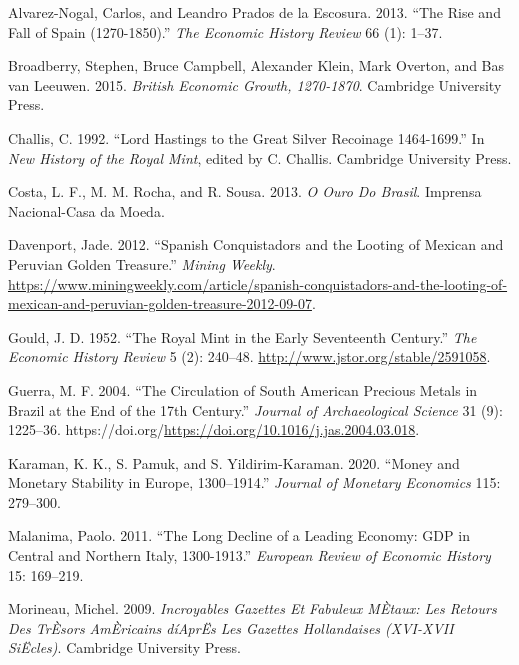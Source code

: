 \documentclass[
  letterpaper,
  DIV=11,
  numbers=noendperiod]{scrartcl}
\newlength{\cslhangindent}
\newlength{\cslentryspacingunit} %
\newenvironment{CSLReferences}[2] %
 {%
  \setlength{\parindent}{0pt}
  \ifodd #1
  \let\oldpar\par
  \def\par{\hangindent=\cslhangindent\oldpar}
  \fi
  \setlength{\parskip}{#2\cslentryspacingunit}
 }%
 {}
\begin{document}
\hypertarget{refs}{}
\begin{CSLReferences}{1}{0}
\leavevmode{}%
Alvarez-Nogal, Carlos, and Leandro Prados de la Escosura. 2013. {``The
Rise and Fall of Spain (1270-1850).''} \emph{The Economic History
Review} 66 (1): 1--37.

\leavevmode{}%
Broadberry, Stephen, Bruce Campbell, Alexander Klein, Mark Overton, and
Bas van Leeuwen. 2015. \emph{British Economic Growth, 1270-1870}.
Cambridge University Press.

\leavevmode{}%
Challis, C. 1992. {``Lord Hastings to the Great Silver Recoinage
1464-1699.''} In \emph{New History of the Royal Mint}, edited by C.
Challis. Cambridge University Press.

\leavevmode{}%
Costa, L. F., M. M. Rocha, and R. Sousa. 2013. \emph{O Ouro Do Brasil}.
Imprensa Nacional-Casa da Moeda.

\leavevmode{}%
Davenport, Jade. 2012. {``Spanish Conquistadors and the Looting of
Mexican and Peruvian Golden Treasure.''} \emph{Mining Weekly}.
\url{https://www.miningweekly.com/article/spanish-conquistadors-and-the-looting-of-mexican-and-peruvian-golden-treasure-2012-09-07}.

\leavevmode{}%
Gould, J. D. 1952. {``The Royal Mint in the Early Seventeenth
Century.''} \emph{The Economic History Review} 5 (2): 240--48.
\url{http://www.jstor.org/stable/2591058}.

\leavevmode{}%
Guerra, M. F. 2004. {``The Circulation of South American Precious Metals
in Brazil at the End of the 17th Century.''} \emph{Journal of
Archaeological Science} 31 (9): 1225--36.
https://doi.org/\url{https://doi.org/10.1016/j.jas.2004.03.018}.

\leavevmode{}%
Karaman, K. K., S. Pamuk, and S. Yildirim-Karaman. 2020. {``Money and
Monetary Stability in Europe, 1300--1914.''} \emph{Journal of Monetary
Economics} 115: 279--300.

\leavevmode{}%
Malanima, Paolo. 2011. {``The Long Decline of a Leading Economy: GDP in
Central and Northern Italy, 1300-1913.''} \emph{European Review of
Economic History} 15: 169--219.

\leavevmode{}%
Morineau, Michel. 2009. \emph{Incroyables Gazettes Et Fabuleux MÈtaux:
Les Retours Des TrÈsors AmÈricains díAprËs Les Gazettes Hollandaises
(XVI-XVII SiËcles)}. Cambridge University Press.


\end{CSLReferences}
\end{document}
